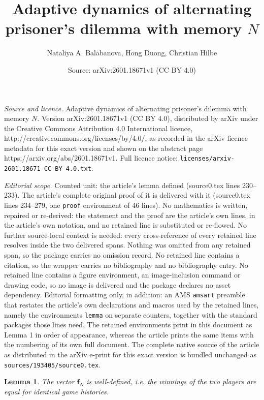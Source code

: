 \documentclass[10pt,a4paper]{amsart}
\title{Adaptive dynamics of alternating prisoner's dilemma with memory $N$}
\author{Nataliya A. Balabanova, Hong Duong, Christian Hilbe}
\date{Source: arXiv:2601.18671v1 (CC BY 4.0)}
\newtheorem{lemma}{Lemma}
\def\f{\mathbf{f}}
\begin{document}
\maketitle

\noindent\emph{Source and licence.} Adaptive dynamics of alternating prisoner's dilemma with memory $N$. Version arXiv:2601.18671v1 (CC BY 4.0), distributed by arXiv under the Creative Commons Attribution 4.0 International licence, http://creativecommons.org/licenses/by/4.0/, as recorded in the arXiv licence metadata for this exact version and shown on the abstract page https://arxiv.org/abs/2601.18671v1. Full licence notice: \texttt{licenses/arxiv-2601.18671-CC-BY-4.0.txt}.\par\smallskip

\noindent\textit{Editorial scope.} Counted unit: the article's lemma defined (source0.tex lines 230--233). The article's complete original proof of it is delivered with it (source0.tex lines 234--279, one \texttt{proof} environment of 46 lines). No mathematics is written, repaired or re-derived: the statement and the proof are the article's own lines, in the article's own notation, and no retained line is substituted or re-flowed.  No further source-local context is needed: every cross-reference of every retained line resolves inside the two delivered spans.  Nothing was omitted from any retained span, so the package carries no omission record.  No retained line contains a citation, so the wrapper carries no bibliography and no bibliography entry.  No retained line contains a figure environment, an image-inclusion command or drawing code, so no image is delivered and the package declares no asset dependency.  Editorial formatting only, in addition: an AMS \texttt{amsart} preamble that restates the article's own declarations and macros used by the retained lines, namely the environments \texttt{lemma} on separate counters, together with the standard packages those lines need.  The retained environments print in this document as Lemma 1 in order of appearance, whereas the article prints the same items with the numbering of its own full document.  The complete native source of the article as distributed in the arXiv e-print for this exact version is bundled unchanged as \texttt{sources/193405/source0.tex}.
\begin{lemma}
\label{st: payoff vector correctly defined}
    The vector $\f_N$ is well-defined, i.e. the winnings of the two players are equal for identical game histories. 
\end{lemma}
\end{document}
